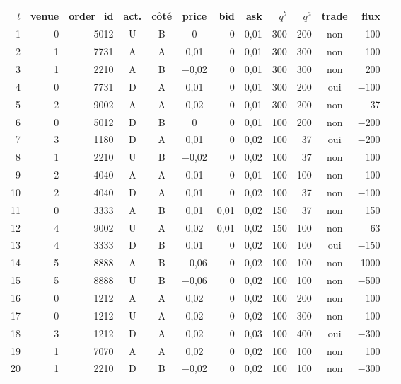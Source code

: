 \begin{tabular}{rrrcccrrrrcrl}
\toprule
$t$ & venue & order\_id & act. & côté & price & bid & ask & $q^b$ & $q^a$ & trade & flux\\
\midrule
1 & 0 & 5012 & U & B & 0 & 0 & 0{,}01 & 300 & 200 & non & $-$100\\
2 & 1 & 7731 & A & A & 0{,}01 & 0 & 0{,}01 & 300 & 300 & non & 100\\
3 & 1 & 2210 & A & B & $-$0{,}02 & 0 & 0{,}01 & 300 & 300 & non & 200\\
4 & 0 & 7731 & D & A & 0{,}01 & 0 & 0{,}01 & 300 & 200 & oui & $-$100\\
5 & 2 & 9002 & A & A & 0{,}02 & 0 & 0{,}01 & 300 & 200 & non & 37\\
6 & 0 & 5012 & D & B & 0 & 0 & 0{,}01 & 100 & 200 & non & $-$200\\
7 & 3 & 1180 & D & A & 0{,}01 & 0 & 0{,}02 & 100 & 37 & oui & $-$200\\
8 & 1 & 2210 & U & B & $-$0{,}02 & 0 & 0{,}02 & 100 & 37 & non & 100\\
9 & 2 & 4040 & A & A & 0{,}01 & 0 & 0{,}01 & 100 & 100 & non & 100\\
10 & 2 & 4040 & D & A & 0{,}01 & 0 & 0{,}02 & 100 & 37 & non & $-$100\\
11 & 0 & 3333 & A & B & 0{,}01 & 0{,}01 & 0{,}02 & 150 & 37 & non & 150\\
12 & 4 & 9002 & U & A & 0{,}02 & 0{,}01 & 0{,}02 & 150 & 100 & non & 63\\
13 & 4 & 3333 & D & B & 0{,}01 & 0 & 0{,}02 & 100 & 100 & oui & $-$150\\
14 & 5 & 8888 & A & B & $-$0{,}06 & 0 & 0{,}02 & 100 & 100 & non & 1000\\
15 & 5 & 8888 & U & B & $-$0{,}06 & 0 & 0{,}02 & 100 & 100 & non & $-$500\\
16 & 0 & 1212 & A & A & 0{,}02 & 0 & 0{,}02 & 100 & 200 & non & 100\\
17 & 0 & 1212 & U & A & 0{,}02 & 0 & 0{,}02 & 100 & 300 & non & 100\\
18 & 3 & 1212 & D & A & 0{,}02 & 0 & 0{,}03 & 100 & 400 & oui & $-$300\\
19 & 1 & 7070 & A & A & 0{,}02 & 0 & 0{,}02 & 100 & 100 & non & 100\\
20 & 1 & 2210 & D & B & $-$0{,}02 & 0 & 0{,}02 & 100 & 100 & non & $-$300\\
\bottomrule
\end{tabular}